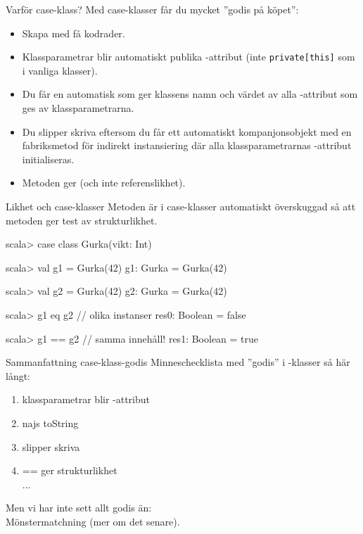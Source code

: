 




\begin{Slide}{Varför case-klass?}
Med case-klasser får du mycket ''godis på köpet'':
\begin{itemize}
\item Skapa  med få kodrader.
\item Klassparametrar blir automatiskt publika -attribut (inte \texttt{private[this]} som i vanliga klasser).
\item Du får en automatisk  som ger klassens namn och värdet av alla -attribut som ges av klassparametrarna.
\item Du slipper skriva  eftersom du får ett automatiskt kompanjonsobjekt med en fabriksmetod  för indirekt instansiering där alla klassparametrarnas -attribut initialiseras.
\item Metoden \code{==} ger  (och inte referenslikhet).
\end{itemize}
\end{Slide}



\begin{Slide}{Likhet och case-klasser}
Metoden  är i case-klasser automatiskt överskuggad så att metoden \code{==} ger test av strukturlikhet. 
\begin{REPL}
scala> case class Gurka(vikt: Int)

scala> val g1 = Gurka(42)
g1: Gurka = Gurka(42)

scala> val g2 = Gurka(42)
g2: Gurka = Gurka(42)

scala> g1 eq g2          // olika instanser
res0: Boolean = false

scala> g1 == g2          // samma innehåll!
res1: Boolean = true
\end{REPL}
\end{Slide}



\begin{Slide}{Sammanfattning case-klass-godis}
Minneschecklista med ''godis'' i -klasser så här långt:
\begin{enumerate}
\item klassparametrar blir -attribut 
\item najs toString
\item slipper skriva 
\item == ger strukturlikhet
\pause~\\...
\end{enumerate}

\vspace{1em}Men vi har inte sett allt godis än: \\Mönstermatchning (mer om det senare).
\end{Slide}

